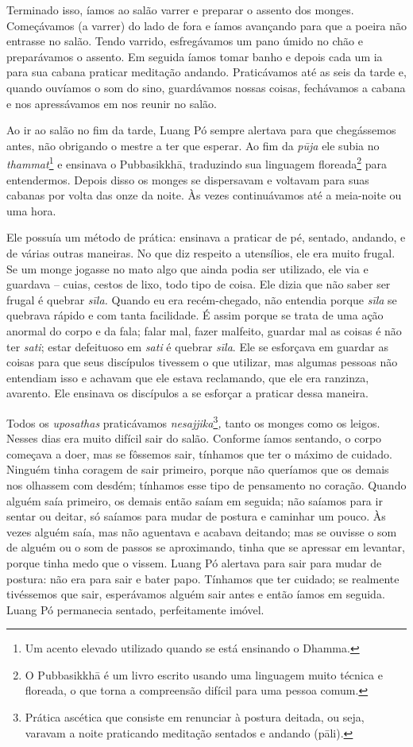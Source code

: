 Terminado isso, íamos ao salão varrer e preparar o assento dos monges.
Começávamos (a varrer) do lado de fora e íamos avançando para que a
poeira não entrasse no salão. Tendo varrido, esfregávamos um pano úmido
no chão e preparávamos o assento. Em seguida íamos tomar banho e depois
cada um ia para sua cabana praticar meditação andando. Praticávamos até
as seis da tarde e, quando ouvíamos o som do sino, guardávamos nossas
coisas, fechávamos a cabana e nos apressávamos em nos reunir no salão.

Ao ir ao salão no fim da tarde, Luang Pó sempre alertava para que
chegássemos antes, não obrigando o mestre a ter que esperar. Ao fim da
\emph{pūja} ele subia no \emph{thammat}\footnote{Um acento elevado
  utilizado quando se está ensinando o Dhamma.} e ensinava o
Pubbasikkhā, traduzindo sua linguagem floreada\footnote{O Pubbasikkhā é
  um livro escrito usando uma linguagem muito técnica e floreada, o que
  torna a compreensão difícil para uma pessoa comum.} para entendermos.
Depois disso os monges se dispersavam e voltavam para suas cabanas por
volta das onze da noite. Às vezes continuávamos até a meia-noite ou uma
hora.

Ele possuía um método de prática: ensinava a praticar de pé, sentado,
andando, e de várias outras maneiras. No que diz respeito a utensílios,
ele era muito frugal. Se um monge jogasse no mato algo que ainda podia
ser utilizado, ele via e guardava -- cuias, cestos de lixo, todo tipo de
coisa. Ele dizia que não saber ser frugal é quebrar \emph{sīla.} Quando
eu era recém-chegado, não entendia porque \emph{sīla} se quebrava rápido
e com tanta facilidade. É assim porque se trata de uma ação anormal do
corpo e da fala; falar mal, fazer malfeito, guardar mal as coisas é não
ter \emph{sati}; estar defeituoso em \emph{sati} é quebrar \emph{sīla}.
Ele se esforçava em guardar as coisas para que seus discípulos tivessem
o que utilizar, mas algumas pessoas não entendiam isso e achavam que ele
estava reclamando, que ele era ranzinza, avarento. Ele ensinava os
discípulos a se esforçar a praticar dessa maneira.

Todos os \emph{uposathas} praticávamos \emph{nesajjika}\footnote{Prática
  ascética que consiste em renunciar à postura deitada, ou seja, varavam
  a noite praticando meditação sentados e andando (pāli).}\emph{,} tanto
os monges como os leigos. Nesses dias era muito difícil sair do salão.
Conforme íamos sentando, o corpo começava a doer, mas se fôssemos sair,
tínhamos que ter o máximo de cuidado. Ninguém tinha coragem de sair
primeiro, porque não queríamos que os demais nos olhassem com desdém;
tínhamos esse tipo de pensamento no coração. Quando alguém saía
primeiro, os demais então saíam em seguida; não saíamos para ir sentar
ou deitar, só saíamos para mudar de postura e caminhar um pouco. Às
vezes alguém saía, mas não aguentava e acabava deitando; mas se ouvisse
o som de alguém ou o som de passos se aproximando, tinha que se apressar
em levantar, porque tinha medo que o vissem. Luang Pó alertava para sair
para mudar de postura: não era para sair e bater papo. Tínhamos que ter
cuidado; se realmente tivéssemos que sair, esperávamos alguém sair antes
e então íamos em seguida. Luang Pó permanecia sentado, perfeitamente
imóvel.

